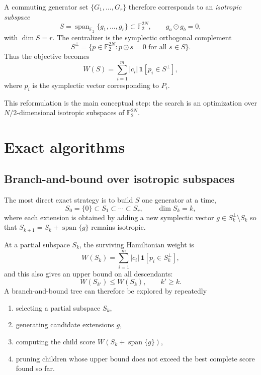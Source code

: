 \documentclass[11pt]{article}
\newcommand{\F}{\mathbb{F}_2}
\begin{document}
A commuting generator set $\{G_1,\dots,G_r\}$ therefore corresponds to an \emph{isotropic subspace}
\begin{equation}
  S = \operatorname{span}_{\mathbb{F}_2}\{g_1,\dots,g_r\} \subset \F^{2N},
  \qquad g_a\odot g_b=0,
\end{equation}
with $\dim S=r$. The centralizer is the symplectic orthogonal complement
\begin{equation}
  S^{\perp} = \{p\in \F^{2N}: p\odot s = 0 \text{ for all } s\in S\}.
\end{equation}
Thus the objective becomes
\begin{equation}
  W(S)=\sum_{i=1}^m |c_i|\,\mathbf{1}[p_i\in S^{\perp}],
  \label{eq:W_S}
\end{equation}
where $p_i$ is the symplectic vector corresponding to $P_i$.

This reformulation is the main conceptual step: the search is an optimization over $N/2$-dimensional isotropic subspaces of $\F^{2N}$.

\section{Exact algorithms}
\subsection{Branch-and-bound over isotropic subspaces}
The most direct exact strategy is to build $S$ one generator at a time,
\begin{equation}
  S_0=\{0\}\subset S_1\subset \cdots \subset S_r,
  \qquad \dim S_k=k,
\end{equation}
where each extension is obtained by adding a new symplectic vector $g\in S_k^{\perp}\setminus S_k$ so that $S_{k+1}=S_k+\operatorname{span}\{g\}$ remains isotropic.

At a partial subspace $S_k$, the surviving Hamiltonian weight is
\begin{equation}
  W(S_k)=\sum_{i=1}^m |c_i|\,\mathbf{1}[p_i\in S_k^{\perp}],
\end{equation}
and this also gives an upper bound on all descendants:
\begin{equation}
  W(S_{k'})\le W(S_k), \qquad k'\ge k.
\end{equation}
A branch-and-bound tree can therefore be explored by repeatedly
\begin{enumerate}[label=\arabic*.]
  \item selecting a partial subspace $S_k$,
  \item generating candidate extensions $g$,
  \item computing the child score $W(S_k+\operatorname{span}\{g\})$,
  \item pruning children whose upper bound does not exceed the best complete score found so far.
\end{enumerate}
\end{document}
